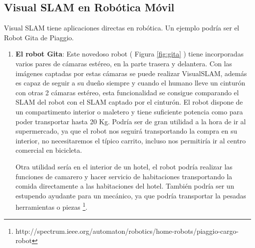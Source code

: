 \subsection{Visual SLAM en Robótica Móvil}
Visual SLAM tiene aplicaciones directas en robótica. Un ejemplo podría ser el Robot Gita de Piaggio.
\begin {enumerate}
\item \textbf{El robot Gita}: Este novedoso robot ( Figura \ref{fig:gita} ) tiene incorporadas varios pares de cámaras estéreo, en la parte trasera y delantera. Con las imágenes captadas por estas cámaras se puede realizar VisualSLAM, además es capaz de seguir a su dueño siempre y cuando el humano lleve un cinturón con otras 2 cámaras estéreo, esta funcionalidad se consigue comparando el SLAM del robot con el SLAM captado por el cinturón.
El robot dispone de un compartimento interior o maletero y tiene suficiente potencia como para poder transportar hasta 20 Kg. Podría ser de gran utilidad a la hora de ir al supermercado, ya que el robot nos seguirá transportando la compra en su interior, no necesitaremos el típico carrito, incluso nos permitiría ir al centro comercial en bicicleta.

 Otra utilidad sería en el interior de un hotel, el robot podría realizar las funciones de camarero y hacer servicio de habitaciones transportando la comida directamente a las habitaciones del hotel. También podría ser un estupendo ayudante para un mecánico, ya que podría transportar la pesadas herramientas o piezas
\footnote{http://spectrum.ieee.org/automaton/robotics/home-robots/piaggio-cargo-robot}.



\end{enumerate}
